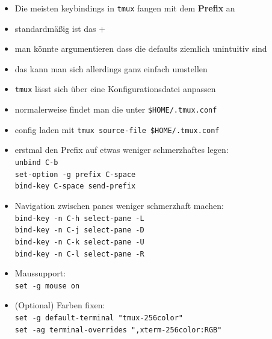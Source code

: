 \documentclass[plain]{beamer}
\newcommand{\prefix}{\Ctrl+\keystroke{b}}
\newcommand{\tmux}{\texttt{tmux}}
\begin{document}
\begin{frame}
  \begin{itemize}
    \item Die meisten keybindings in \tmux{} fangen mit dem \textbf{Prefix} an
    \item standardmäßig ist das \prefix
    \item man könnte argumentieren dass die defaults ziemlich unintuitiv sind
    \item das kann man sich allerdings ganz einfach umstellen
  \end{itemize}
\end{frame}

\begin{frame}
  \begin{itemize}
    \item \tmux{} lässt sich über eine Konfigurationsdatei anpassen
    \item normalerweise findet man die unter \texttt{\$HOME/.tmux.conf}
    \item config laden mit \texttt{tmux source-file \$HOME/.tmux.conf}
  \end{itemize}
\end{frame}

\begin{frame}
  \begin{itemize}
    \item erstmal den Prefix auf etwas weniger schmerzhaftes legen: \\
    \texttt{unbind C-b \\
            set-option -g prefix C-space \\
            bind-key C-space send-prefix}

    \item Navigation zwischen panes weniger schmerzhaft machen: \\
    \texttt{bind-key -n C-h select-pane -L \\
            bind-key -n C-j select-pane -D \\
            bind-key -n C-k select-pane -U \\
            bind-key -n C-l select-pane -R}

    \item Maussupport:\\
    \texttt{set -g mouse on}
    \item (Optional) Farben fixen:\\
    \texttt{set -g default-terminal "tmux-256color"\\
            set -ag terminal-overrides ",xterm-256color:RGB"}
  \end{itemize}
\end{frame}
\end{document}
